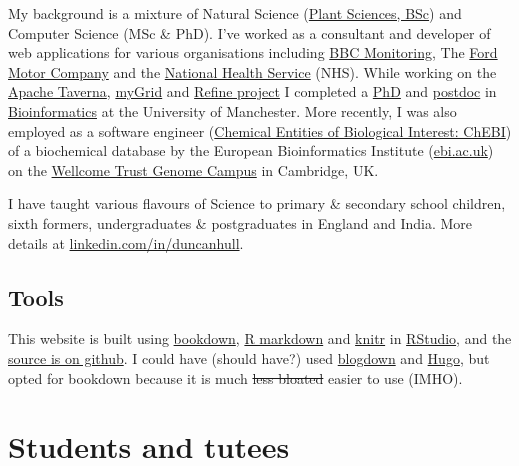 \documentclass[12pt,]{book}
\begin{document}
My background is a mixture of Natural Science (\href{http://www.plantsciences.manchester.ac.uk/}{Plant Sciences, BSc}) and Computer Science (MSc \& PhD). I've worked as a consultant and developer of web applications for various organisations including \href{https://en.wikipedia.org/wiki/BBC_Monitoring}{BBC Monitoring}, The \href{https://en.wikipedia.org/wiki/Ford_Motor_Company}{Ford Motor Company} and the \href{https://en.wikipedia.org/wiki/National_Health_Service}{National Health Service} (NHS). While working on the \href{https://en.wikipedia.org/wiki/Apache_Taverna}{Apache Taverna}, \href{https://en.wikipedia.org/wiki/MyGrid}{myGrid} and \href{http://www.nactem.ac.uk/pathtext/}{Refine project} I completed a \href{https://ethos.bl.uk/OrderDetails.do?uin=uk.bl.ethos.497578}{PhD} and \href{https://en.wikipedia.org/wiki/Postdoctoral_researcher}{postdoc} in \href{https://en.wikipedia.org/wiki/Bioinformatics}{Bioinformatics} at the University of Manchester. More recently, I was also employed as a software engineer (\href{https://www.ebi.ac.uk/chebi/}{Chemical Entities of Biological Interest: ChEBI}) of a biochemical database by the European Bioinformatics Institute (\href{https://www.ebi.ac.uk}{ebi.ac.uk}) on the \href{https://en.wikipedia.org/wiki/Wellcome_Genome_Campus}{Wellcome Trust Genome Campus} in Cambridge, UK.

I have taught various flavours of Science to primary \& secondary school children, sixth formers, undergraduates \& postgraduates in England and India. More details at \href{https://uk.linkedin.com/in/duncanhull}{linkedin.com/in/duncanhull}.

\hypertarget{tools}{%
\section*{Tools}\label{tools}}

This website is built using \href{https://bookdown.org}{bookdown}, \href{https://rmarkdown.rstudio.com/}{R markdown} and \href{https://en.wikipedia.org/wiki/Knitr}{knitr} in \href{https://www.rstudio.com/}{RStudio}, and the \href{https://github.com/dullhunk/hulled}{source is on github}. I could have (should have?) used \href{https://bookdown.org/yihui/blogdown/}{blogdown} and \href{https://gohugo.io}{Hugo}, but opted for bookdown because it is much \sout{less bloated} easier to use (IMHO).

\hypertarget{students-and-tutees}{%
\chapter{Students and tutees}\label{students-and-tutees}}
\end{document}
